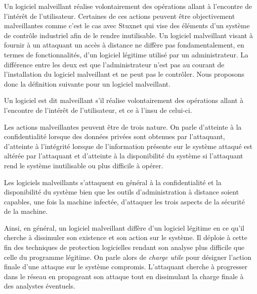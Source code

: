 Un logiciel malveillant réalise volontairement des opérations allant à l'encontre de l'intérêt de l'utilisateur. 
Certaines de ces actions peuvent être objectivement malveillantes comme c'est le cas avec Stuxnet qui vise des éléments d'un système de contrôle industriel afin de le rendre inutilisable. 
Un logiciel malveillant visant à fournir à un attaquant un accès à distance ne diffère pas fondamentalement, en termes de fonctionnalités, d'un logiciel légitime utilisé par un administrateur.
La différence entre les deux est que l'administrateur n'est pas au courant de l'installation du logiciel malveillant et ne peut pas le contrôler.
Nous proposons donc la définition suivante pour un logiciel malveillant.
\begin{defi}
Un logiciel est dit malveillant s'il réalise volontairement des opérations allant à l'encontre de l'intérêt de l'utilisateur, et ce à l'insu de celui-ci.
\end{defi}

Les actions malveillantes peuvent être de trois nature. On parle d'atteinte à la confidentialité lorsque des données privées sont obtenues par l'attaquant, d'atteinte à l'intégrité lorsque de l'information présente sur le système attaqué est altérée par l'attaquant et d'atteinte à la disponibilité du système si l'attaquant rend le système inutilisable ou plus difficile à opérer.

Les logiciels malveillants s'attaquent en général à la confidentialité et la disponibilité du système bien que les outils d'administration à distance soient capables, une fois la machine infectée, d'attaquer les trois aspects de la sécurité de la machine.

Ainsi, en général, un logiciel malveillant diffère d'un logiciel légitime en ce qu'il cherche à dissimuler son existence et son action sur le système. Il déploie à cette fin des techniques de protection logicielles rendant son analyse plus difficile que celle du programme légitime.
On parle alors de \emph{charge utile} pour désigner l'action finale d'une attaque sur le système compromis. L'attaquant cherche à progresser dans le réseau en propageant son attaque tout en dissimulant la charge finale à des analystes éventuels.


